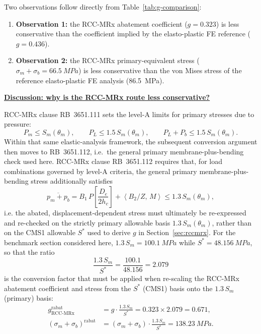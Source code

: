 \documentclass[10pt,a4paper]{article}
\begin{document}
Two observations follow directly from Table~\ref{tab:g-comparison}:

\begin{enumerate}
\item \textbf{Observation 1:} the RCC-MRx abatement coefficient ($g=0.323$) is less conservative than the coefficient implied by the elasto-plastic FE reference ($g=0.436$).
\item \textbf{Observation 2:} the RCC-MRx primary-equivalent stress ($\sigma_m+\sigma_b = \SI{66.5}{MPa}$) is less conservative than the von Mises stress of the reference elasto-plastic FE analysis (\SI{86.5}{MPa}).
\end{enumerate}

\vspace{2\baselineskip}

\underline{\textbf{Discussion: why is the RCC-MRx route less conservative?}}


RCC-MRx clause RB~3651.111 sets the level-A limits for primary stresses due to pressure:
\[
P_m \le S_m(\theta_m), \qquad
P_L \le 1.5\,S_m(\theta_m), \qquad
P_L + P_b \le 1.5\,S_m(\theta_m).
\]
Within that same elastic-analysis framework, the subsequent conversion argument then moves to RB~3651.112, i.e.\ the general primary membrane-plus-bending check used here. RCC-MRx clause RB~3651.112 requires that, for load combinations governed by level-A criteria, the general primary membrane-plus-bending stress additionally satisfies
\begin{equation}
\overline{p_m+p_b} = B_1\,P\left[\frac{D_e}{2h_c}\right] + \left\langle B_2/Z,\,M\right\rangle \le 1.3\,S_m(\theta_m),
\label{eq:pmpb}
\end{equation}
i.e. the abated, displacement-dependent stress must ultimately be re-expressed and re-checked on the strictly primary allowable basis $1.3\,S_m(\theta_m)$, rather than on the CMS1 allowable $S^{*}$ used to derive $g$ in Section~\ref{sec:rccmrx}. For the benchmark section considered here, $1.3\,S_m = \SI{100.1}{MPa}$ while $S^{*} = \SI{48.156}{MPa}$, so that the ratio
\begin{equation}
\frac{1.3\,S_m}{S^{*}} = \frac{100.1}{48.156} = 2.079
\end{equation}
is the conversion factor that must be applied when re-scaling the RCC-MRx abatement coefficient and stress from the $S^{*}$ (CMS1) basis onto the $1.3\,S_m$ (primary) basis:
\begin{equation}
\begin{aligned}
g_{\mathrm{RCC\text{-}MRx}}^{\mathrm{rabat}} &=
g\cdot\frac{1.3\,S_m}{S^{*}}
= 0.323\times 2.079
= 0.671, \\
(\sigma_m+\sigma_b)^{\mathrm{rabat}} &=
(\sigma_m+\sigma_b)\cdot\frac{1.3\,S_m}{S^{*}}
= \SI{138.23}{MPa}.
\end{aligned}
\end{equation}
\end{document}
